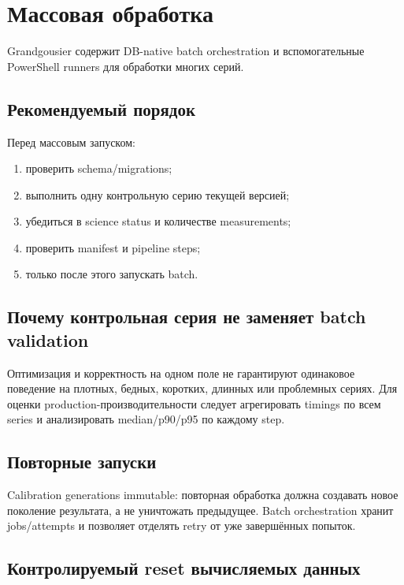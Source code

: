 \chapter{Массовая обработка}

Grandgousier содержит DB-native batch orchestration и вспомогательные PowerShell runners для обработки многих серий.

\section{Рекомендуемый порядок}

Перед массовым запуском:

\begin{enumerate}
  \item проверить schema/migrations;
  \item выполнить одну контрольную серию текущей версией;
  \item убедиться в science status и количестве measurements;
  \item проверить manifest и pipeline steps;
  \item только после этого запускать batch.
\end{enumerate}

\section{Почему контрольная серия не заменяет batch validation}

Оптимизация и корректность на одном поле не гарантируют одинаковое поведение на плотных, бедных, коротких, длинных или проблемных сериях. Для оценки production-производительности следует агрегировать timings по всем series и анализировать median/p90/p95 по каждому step.

\section{Повторные запуски}

Calibration generations immutable: повторная обработка должна создавать новое поколение результата, а не уничтожать предыдущее. Batch orchestration хранит jobs/attempts и позволяет отделять retry от уже завершённых попыток.

\section{Контролируемый reset вычисляемых данных}

